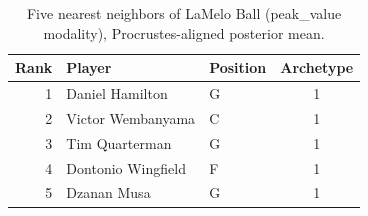 \begin{table}[htbp]
  \centering\small
  \begin{tabular}{rllc}
    \toprule
    Rank & Player & Position & Archetype \\
    \midrule
    1 & Daniel Hamilton & G & 1 \\
    2 & Victor Wembanyama & C & 1 \\
    3 & Tim Quarterman & G & 1 \\
    4 & Dontonio Wingfield & F & 1 \\
    5 & Dzanan Musa & G & 1 \\
    \bottomrule
  \end{tabular}
  \caption{Five nearest neighbors of LaMelo Ball (peak_value modality), Procrustes-aligned posterior mean.}
  \label{tab:LaMelo_Ball_neighbors_peak_value}
\end{table}

